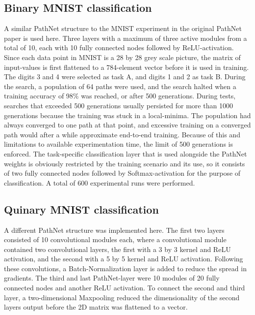 

\subsection{Binary MNIST classification}
A similar PathNet structure to the MNIST experiment in the original PathNet paper is used here. 
Three layers with a maximum of three active modules from a total of 10, each with 10 fully connected nodes followed by ReLU-activation. Since each data point in MNIST is a 28 by 28 grey scale picture, the matrix of input-values is first flattened to a 784-element vector before it is used in training. The digits 3 and 4 were selected as task A, and digits 1 and 2 as task B. 
During the search, a population of 64 paths were used, and the search halted when a training accuracy of 98\% was reached, or after 500 generations. During tests, searches that exceeded 500 generations usually persisted for more than 1000 generations because the training was stuck in a local-minima. The population had always converged to one path at that point, and excessive training on a converged path would after a while approximate end-to-end training. Because of this and limitations to available experimentation time, the limit of 500 generations is enforced. The task-specific classification layer that is used alongside the PathNet weights is obviously restricted by the training scenario and its use, so it consists of two fully connected nodes followed by Softmax-activation for the purpose of classification.
A total of 600 experimental runs were performed.

\subsection{Quinary MNIST classification}
A different PathNet structure was implemented here. The first two layers consisted of 10 convolutional modules each, where a convolutional module contained two convolutional layers, the first with a 3 by 3 kernel and ReLU activation, and the second with a 5 by 5 kernel and ReLU activation. Following these convolutions, a Batch-Normalization layer is added to reduce the spread in gradients. The third and last PathNet-layer were 10 modules of 20 fully connected nodes and another ReLU activation. To connect the second and third layer, a two-dimensional Maxpooling reduced the dimensionality of the second layers output before the 2D matrix was flattened to a vector.   

